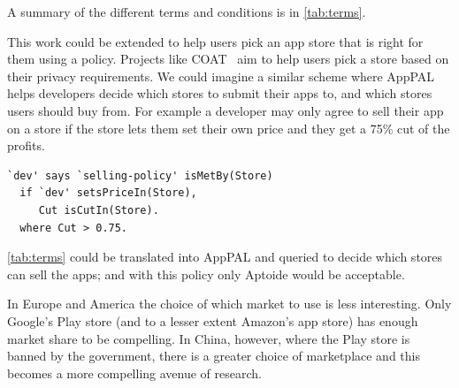 \documentclass[a4paper]{scrartcl}
\begin{document}
A summary of the different terms and conditions is in \autoref{tab:terms}.

This work could be extended to help users pick an app store that is right for them using a policy.
Projects like COAT~\citep{Fernandez:5lFoplRA} aim to help users pick a store based on their privacy requirements.
We could imagine a similar scheme where AppPAL helps developers decide which stores to submit their apps to,
  and which stores users should buy from.
For example a developer may only agree to sell their app on a store if the store lets them set their own price and they get a 75\% cut of the profits.
\begin{lstlisting}
`dev' says `selling-policy' isMetBy(Store)
  if `dev' setsPriceIn(Store),
     Cut isCutIn(Store).
  where Cut > 0.75.
\end{lstlisting}
\autoref{tab:terms} could be translated into AppPAL and queried to decide which stores can sell the apps; and with this policy only Aptoide would be acceptable.

In Europe and America the choice of which market to use is less interesting.
Only Google's Play store (and to a lesser extent Amazon's app store) has enough market share to be compelling.
In China, however, where the Play store is banned by the government, there is a greater choice of marketplace and this becomes a more compelling avenue of research.
\end{document}
